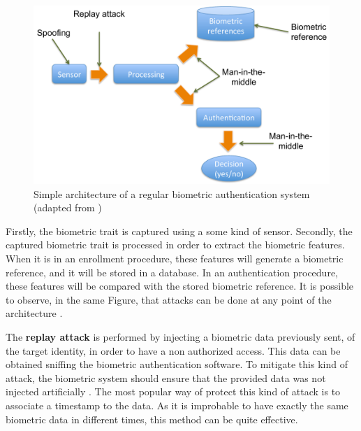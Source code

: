 \begin{figure}[!htb]
\begin{center}
\includegraphics [width=14cm] {images/diagram_attacks.pdf}
\caption[]{Simple architecture of a regular biometric authentication system (adapted from \cite{xiao2005security})} \label{fig:diagram_attacks}
\end{center}
\end{figure}

Firstly, the biometric trait is captured using a some kind of sensor. Secondly, the captured biometric trait is processed in order to extract the biometric features. When it is in an enrollment procedure, these features will generate a biometric reference, and it will be stored in a database. In an authentication procedure, these features will be compared with the stored biometric reference. It is possible to observe, in the same Figure, that attacks can be done at any point of the architecture \cite{xiao2005security}. 


The \textbf{replay attack} is performed by injecting a biometric data previously sent, of the target identity, in order to have a non authorized access. This data can be obtained sniffing the biometric authentication software. To mitigate this kind of attack, the biometric system should ensure that the provided data was not injected artificially \cite{xiao2005security}. The most  popular way of protect this kind of attack is to associate a timestamp to the data. As it is improbable to have exactly the same biometric data in different times, this method can be quite effective.

